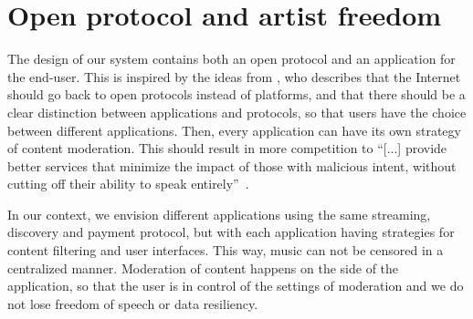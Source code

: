 


\section{Open protocol and artist freedom}
The design of our system contains both an open protocol and an application for the end-user. This is inspired by the ideas from \cite{masnick2019protocols}, who describes that the Internet should go back to open protocols instead of platforms, and that there should be a clear distinction between applications and protocols, so that users have the choice between different applications. Then, every application can have its own strategy of content moderation. This should result in more competition to ``[...] provide better services that minimize the impact of those
with malicious intent, without cutting off their ability to speak entirely''~\citep{masnick2019protocols}.

In our context, we envision different applications using the same streaming, discovery and payment protocol, but with each application having strategies for content filtering and user interfaces. This way, music can not be censored in a centralized manner. Moderation of content happens on the side of the application, so that the user is in control of the settings of moderation and we do not lose freedom of speech or data resiliency.

